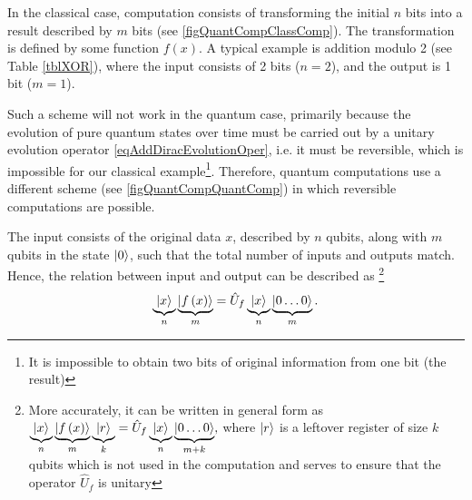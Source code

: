 

In the classical case, computation consists of transforming the initial $n$
bits into a result described by $m$ bits
(see \autoref{figQuantCompClassComp}). The transformation 
is defined by some function $f\left(x\right)$. 
A typical example is addition modulo 2 (see Table \ref{tblXOR}), where the input consists of 2 bits
($n = 2$), and the output is 1 bit ($m = 1$).



Such a scheme will not work in the quantum case, primarily because
the evolution of pure quantum states over time must be carried out by a unitary evolution operator
\eqref{eqAddDiracEvolutionOper}, i.e. it must be reversible, which is impossible 
for our classical example\footnote{It is impossible to obtain
  two bits of original information from one bit (the result)}. Therefore, quantum computations
use a different scheme
(see \autoref{figQuantCompQuantComp}) in which reversible computations are possible.

The input consists of the original data $x$, described by $n$ qubits,
along with $m$ qubits in the state $\ket{0}$,
such that the total number of inputs and outputs match.
Hence, the relation between input and output can be described as
\footnote{More accurately, it can be written in general form as
$
\underbrace{\ket{x}}_n
\underbrace{\left|f\left(x\right)\right>}_m
\underbrace{\ket{r}}_k = 
\hat{U}_f \underbrace{\ket{x}}_n
\underbrace{\left|0 \dots 0\right>}_{m+k},
$
where $\ket{r}$ is a leftover register of size $k$ qubits which is not used in the computation and serves to ensure that the operator $\hat{U}_f$ is unitary
}
\begin{equation}
\underbrace{\ket{x}}_n
\underbrace{\left|f\left(x\right)\right>}_m = 
\hat{U}_f \underbrace{\ket{x}}_n\underbrace{\left|0 \dots
  0\right>}_m.
\label{eqQuantCompQuantComp}
\end{equation}

